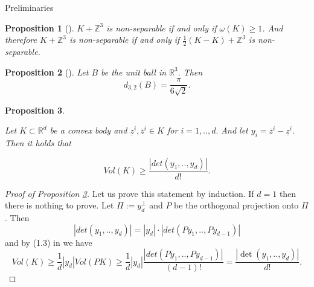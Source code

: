 \documentclass[12pt]{article}
\newcommand\Z{\mathbb Z}
\newtheorem{proposition}{Proposition}[section]
\begin{document}
\begin{section}{Preliminaries}
    \begin{proposition}
    [\cite{makai1974}]
        $K+\Z^{3}$ is non-separable if and only if $\omega(K)\geq 1$.  And therefore $K+\Z^{3}$ is non-separable if and only if $\frac{1}{2}(K-K)+\Z^{3}$ is non-separable.  
    \end{proposition}

    \begin{proposition}[\cite{makai1978}]
        \label{d32-ball}
        Let $B$ be the unit ball in $\mathbb{R}^{3}.$ Then 
        $$
            d_{3,2}(B) = \frac{\pi}{6\sqrt{2}}.
        $$
    \end{proposition}

    \begin{proposition} 
    \label{app}
    
    Let $K\subset \mathbb{R}^{d}$ be a convex body and $\underline{z}^{i},\overline{z}^{i}\in K$ for $i =1,..,d.$ And let $y_{i} = \overline{z}^{i}-\underline{z}^{i}.$ Then it holds that

    $$
        Vol(K)\geq \frac{|det(y_{1},..,y_{d})|}{d!}.
    $$
        
    \end{proposition}

    \begin{proof}[Proof of Proposition \ref{app}]
        Let us prove this statement by induction. If $d=1$ then there is nothing to prove. Let $\Pi := y_{d}^{\perp}$ and $P$ be the orthogonal projection onto $\Pi$. Then $$|det(y_{1},..,y_{d})| = |y_{d}|\cdot|det(Py_{1},..,Py_{d-1})|$$ and by (1.3) in \cite{zhang} we have 
        $$
            Vol(K)\geq \frac{1}{d}|y_{d}|Vol(PK) \geq \frac{1}{d}|y_{d}|\frac{|det(Py_{1},..,Py_{d-1})|}{(d-1)!} = \frac{|\det(y_{1},..,y_{d})|}{d!}.
        $$
    
    \end{proof}

    
\end{section}
    
\end{document}
